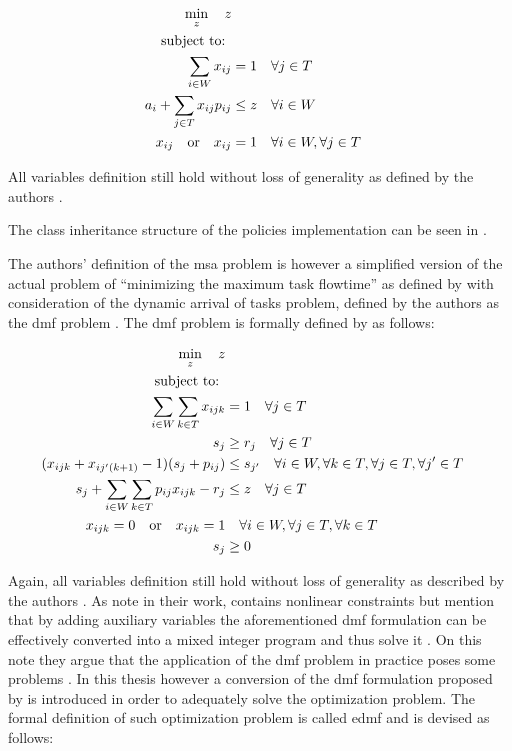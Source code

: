 \documentclass[draft=false]{seal_thesis}
\begin{document}
\begin{align}
    \min_z \quad z\\
    \text{subject to: } \notag \\
    \sum_{i \in W} x_{ij} &= 1 \quad \forall j \in T\\
    a_i + \sum_{j \in T} x_{ij} p_{ij} &\leq z \quad \forall i \in W\\
    x_{ij} \quad \text{or} \quad x_{ij}&=1 \quad \forall i \in W, \forall j \in T
\end{align}

All variables definition still hold without loss of generality as defined by the authors \citep[pp. 5-7]{Zeng2005}.

The class inheritance structure of the policies implementation can be seen in .


The authors' definition of the \gls{msa} problem is however a simplified version of the actual problem of ``minimizing the maximum task flowtime'' as defined by \citet{Baker1974} with consideration of the dynamic arrival of tasks problem, defined by the authors as the \gls{dmf} problem \citep{Zeng2005}. The \gls{dmf} problem is formally defined by \citet{Zeng2005} as follows:

\begin{align}
    \min_z \quad z\\
    \text{subject to: } \notag \\
    \sum_{i \in W} \sum_{k \in T} x_{ijk} &= 1 \quad \forall j \in T\\
    s_j &\geq r_j \quad \forall j \in T\\
    (x_{ijk} + x_{ij'(k+1)} - 1)(s_j + p_{ij}) &\leq s_{j'} \quad \forall i \in W, \forall k \in T, \forall j \in T, \forall j' \in T \label{eq:nonlinear_constraints_dmf}\\
    s_j + \sum_{i \in W} \sum_{k \in T} p_{ij} x_{ijk} - r_j &\leq z \quad \forall j \in T\\
    x_{ijk} = 0 \quad \text{or} \quad x_{ijk} = 1 &\quad \forall i \in W, \forall j \in T, \forall k \in T\\
    s_j &\geq 0
\end{align}

Again, all variables definition still hold without loss of generality as described by the authors \citep[p. 6]{Zeng2005}. As \citet{Zeng2005} note in their work,  contains nonlinear constraints but mention that by adding auxiliary variables the aforementioned \gls{dmf} formulation can be effectively converted into a mixed integer program and thus solve it \citep[p. 6]{Zeng2005}. On this note they argue that the application of the \gls{dmf} problem in practice poses some problems \citep{Zeng2005}. In this thesis however a conversion of the \gls{dmf} formulation proposed by \citet{Zeng2005} is introduced in order to adequately solve the optimization problem. The formal definition of such optimization problem is called \gls{edmf} and is devised as follows:
\end{document}
